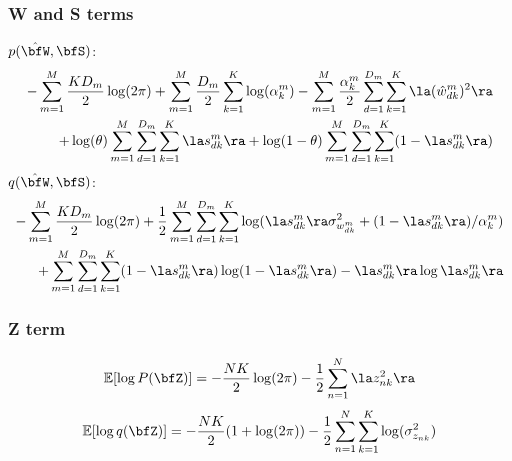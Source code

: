\documentclass[10pt, a4paper,openany]{report}
\begin{document}
\subsubsection{W and S terms}
$p(\hat{\bfW},\bfS)$:
\begin{align*}
-\sum_{m=1}^{M}\frac{KD_m}{2}\log(2\pi) + \sum_{m=1}^{M}\frac{D_m}{2}\sum_{k=1}^{K} \log(\alpha_k^m) - \sum_{m=1}^{M} \frac{\alpha_k^m}{2} \sum_{d=1}^{D_m} \sum_{k=1}^{K} \la (\hat{w}_{dk}^m)^2 \ra \\
+ \log(\theta) \sum_{m=1}^{M} \sum_{d=1}^{D_m} \sum_{k=1}^{K} \la s_{dk}^m \ra + \log(1-\theta) \sum_{m=1}^{M} \sum_{d=1}^{D_m}\sum_{k=1}^{K} (1- \la s_{dk}^m \ra)
\end{align*}
$q(\hat{\bfW},\bfS)$:
\begin{align*}
-\sum_{m=1}^{M}\frac{KD_m}{2}\log(2\pi) + \frac{1}{2}\sum_{m=1}^{M}\sum_{d=1}^{D_m}\sum_{k=1}^{K}\log(\la s_{dk}^m \ra \sigma_{w_{dk}^m}^2 + (1-\la s_{dk}^m \ra)/\alpha_k^m) \\
+ \sum_{m=1}^{M} \sum_{d=1}^{D_m} \sum_{k=1}^{K} (1-\la s_{dk}^m \ra) \log(1 - \la s_{dk}^m \ra) - \la s_{dk}^m \ra \log \la s_{dk}^m \ra
\end{align*}

\subsubsection{Z term}
\[
\mathbb{E} [\log P(\bfZ)] = -\frac{NK}{2}\log(2\pi) -\frac{1}{2} \sum_{n=1}^{N} \la z_{nk}^2 \ra
\]
\[
\mathbb{E} [\log q(\bfZ)] = - \frac{NK}{2}(1 + \log(2\pi)) - \frac{1}{2}\sum_{n=1}^{N}\sum_{k=1}^{K} \log(\sigma_{z_{nk}}^2)
\]

\end{document}

